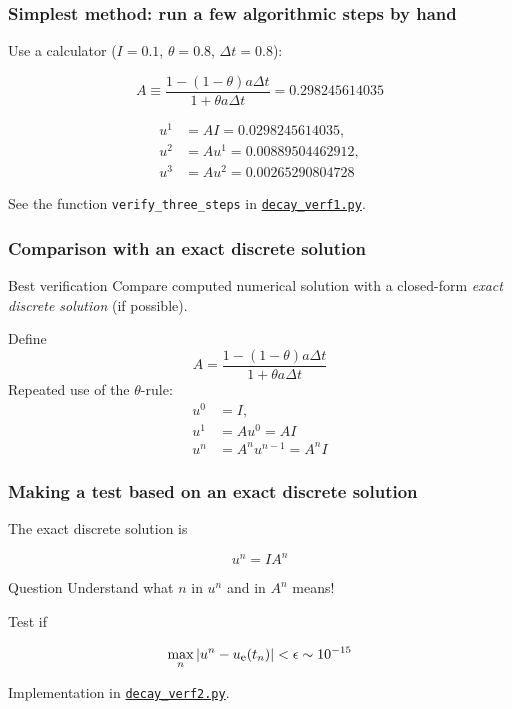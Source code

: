 \documentclass{beamer}
\begin{document}
\begin{frame}
\frametitle{Simplest method: run a few algorithmic steps by hand}

Use a calculator ($I=0.1$, $\theta=0.8$, $\Delta t =0.8$):

\[ A\equiv \frac{1 - (1-\theta) a\Delta t}{1 + \theta a \Delta t} = 0.298245614035\]

\begin{align*}
u^1 &= AI=0.0298245614035,\\ 
u^2 &= Au^1= 0.00889504462912,\\ 
u^3 &=Au^2= 0.00265290804728
\end{align*}

See the function \Verb!verify_three_steps! in \href{{http://tinyurl.com/ofkw6kc/alg/decay_verf1.py}}{\nolinkurl{decay_verf1.py}}.
\end{frame}

\begin{frame}
\frametitle{Comparison with an exact discrete solution}

\begin{block}{Best verification }
Compare computed numerical solution
with a closed-form \emph{exact discrete solution} (if possible).
\end{block}

Define
\[ A = \frac{1 - (1-\theta) a\Delta t}{1 + \theta a \Delta t}\]
Repeated use of the $\theta$-rule:
\begin{align*}
u^0 &= I,\\ 
u^1 &= Au^0 = AI\\ 
u^n &= A^nu^{n-1} = A^nI
\end{align*}
\end{frame}

\begin{frame}
\frametitle{Making a test based on an exact discrete solution}

The exact discrete solution is

\begin{equation}
u^n = IA^n
\label{decay:un:exact}
\end{equation}

\begin{block}{Question}
Understand what $n$ in $u^n$ and in $A^n$ means!
\end{block}

Test if

\[ \max_n |u^n - \uex(t_n)| < \epsilon\sim 10^{-15}\]

Implementation in \href{{http://tinyurl.com/ofkw6kc/alg/decay_verf2.py}}{\nolinkurl{decay_verf2.py}}.
\end{frame}
\end{document}
